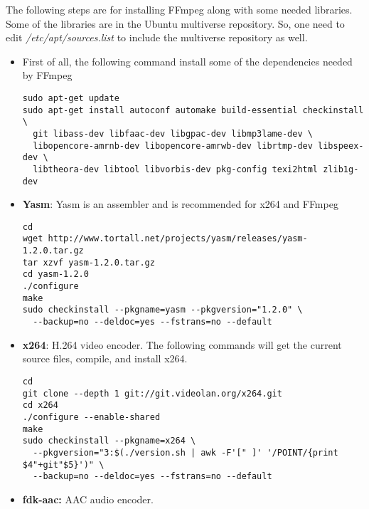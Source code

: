 The following steps are for installing FFmpeg along with some needed libraries. Some of the libraries are in the Ubuntu multiverse repository. So, one need to edit \textit{/etc/apt/sources.list} to include the multiverse repository as well.

\begin{itemize}
\item First of all, the following command install some of the dependencies needed by FFmpeg

\begin{code}
\begin{verbatim}
sudo apt-get update
sudo apt-get install autoconf automake build-essential checkinstall \
  git libass-dev libfaac-dev libgpac-dev libmp3lame-dev \
  libopencore-amrnb-dev libopencore-amrwb-dev librtmp-dev libspeex-dev \
  libtheora-dev libtool libvorbis-dev pkg-config texi2html zlib1g-dev
\end{verbatim}
\end{code}

\item{\textbf{Yasm}:} Yasm is an assembler and is recommended for x264 and FFmpeg

\begin{code}
\begin{verbatim}
cd
wget http://www.tortall.net/projects/yasm/releases/yasm-1.2.0.tar.gz
tar xzvf yasm-1.2.0.tar.gz
cd yasm-1.2.0
./configure
make
sudo checkinstall --pkgname=yasm --pkgversion="1.2.0" \
  --backup=no --deldoc=yes --fstrans=no --default
\end{verbatim}
\end{code}

\item{\textbf{x264}:} H.264 video encoder. The following commands will get the current source files, compile, and install x264.
 
\begin{code}
\begin{verbatim}
cd
git clone --depth 1 git://git.videolan.org/x264.git
cd x264
./configure --enable-shared
make
sudo checkinstall --pkgname=x264 \
  --pkgversion="3:$(./version.sh | awk -F'[" ]' '/POINT/{print $4"+git"$5}')" \
  --backup=no --deldoc=yes --fstrans=no --default
\end{verbatim}
\end{code}

\item{\textbf{fdk-aac:}} AAC audio encoder.


\end{itemize}
